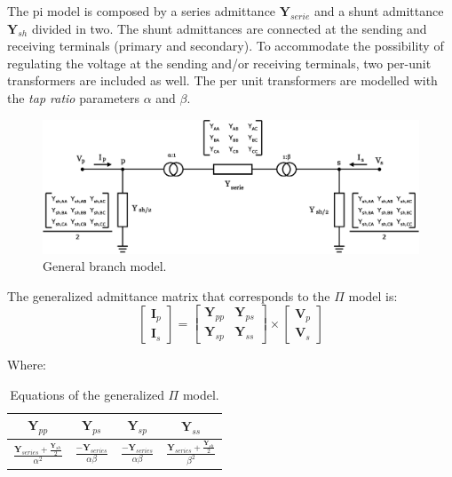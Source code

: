 \documentclass[nols,a4paper,twoside,notoc,fleqn]{tufte-book}
\begin{document}
The pi model is composed by a series admittance  $\textbf{Y}_{serie}$ and a shunt admittance $\textbf{Y}_{sh}$ divided in two. The shunt admittances are connected at the sending and receiving terminals (primary and secondary). To accommodate the possibility of regulating the voltage at the sending and/or receiving terminals, two per-unit transformers are included as well. The per unit transformers are modelled with the \textit{tap ratio} parameters $\alpha$ and $\beta$.


\begin{center}
	\begin{figure}[h]
		\includegraphics[width=0.6\linewidth]{img/Branch.eps}
		\caption{General branch model.}
		\label{pi_model}
	\end{figure}
\end{center}

The generalized admittance matrix that corresponds to the $\Pi$ model is:
\begin{equation}
\left[\begin{array}{c}
\textbf{I}_p \\
\textbf{I}_s
\end{array}\right] = \left[\begin{array}{cc}
\textbf{Y}_{pp} & \textbf{Y}_{ps} \\
\textbf{Y}_{sp} & \textbf{Y}_{ss}
\end{array}\right] \times \left[\begin{array}{c}
\textbf{V}_p \\
\textbf{V}_s
\end{array}\right]
\label{pi_main_formula}
\end{equation}

Where:

\begin{table}[h!]
\begin{center}
\begin{tabular}{cccc}
\toprule

$\textbf{Y}_{pp}$ &  $\textbf{Y}_{ps}$ & $\textbf{Y}_{sp}$ & $\textbf{Y}_{ss}$\\

\midrule

$\frac{\textbf{Y}_{series} + \frac{\textbf{Y}_{sh}}{2}}{\alpha^2}$ &  $\frac{-\textbf{Y}_{series}}{\alpha\beta}$ & $\frac{-\textbf{Y}_{series}}{\alpha\beta}$ & $\frac{\textbf{Y}_{series} + \frac{\textbf{Y}_{sh}}{2}}{\beta^2}$\\

\bottomrule
\end{tabular}
\end{center}
  \caption{Equations of the generalized $\Pi$ model.}
  \label{pi_model_equations}
\end{table}
\end{document}
